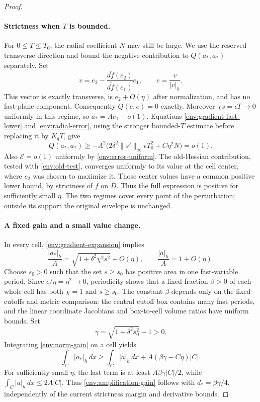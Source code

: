 \begin{proof}
\paragraph{Strictness when $T$ is bounded.}
For $0\le T\le T_0$, the radial coefficient $N$ may still be large.
We use the reserved transverse direction and bound the negative
contribution to $Q(a_*,a_*)$ separately. Set
\begin{equation}\label{env:old-test}
 v=e_2-\frac{d\widetilde f(e_2)}{d\widetilde f(e_1)}e_1,
 \qquad e=\frac{v}{|v|_h}.
\end{equation}
This vector is exactly transverse, is $e_2+O(\eta)$ after
normalization, and has no fast-plane component. Consequently
$Q(e,e)=0$ exactly. Moreover $\chi s=\epsilon T\to0$ uniformly
in this regime, so $a_*=Ae_1+o(1)$. Equations
\eqref{env:gradient-fast-lower} and \eqref{env:radial-error}, using
the stronger bounded-$T$ estimate before replacing it by $K_qT$,
give
\[
 Q(a_*,a_*)\ge
 -A^2\bigl(2\delta^2\|s'\|_\infty\epsilon T_0^2
                  +C\eta^2N\bigr)=o(1).
\]
Also $\mathcal E=o(1)$ uniformly by
\eqref{env:error-uniform}. The old-Hessian contribution, tested with
\eqref{env:old-test}, converges uniformly to its value at the cell
center, where $e_2$ was chosen to maximize it. Those center values
have a common positive lower bound, by strictness of $f$ on
$\overline D$. Thus the full expression is positive for sufficiently
small $\eta$. The two regimes cover every point of the perturbation;
outside its support the original envelope is unchanged.

\paragraph{A fixed gain and a small value change.}
In every cell, \eqref{env:gradient-expansion} implies
\begin{equation}\label{env:norm-gain}
 \frac{|a_*|_h}{A}
   =\sqrt{1+\delta^2\chi^2s^2}+O(\eta),
 \qquad \frac{|a|_h}{A}=1+O(\eta).
\end{equation}
Choose $s_0>0$ such that the set $s\ge s_0$ has positive area in
one fast-variable period. Since $\epsilon/\eta=\eta^2\to0$,
periodicity shows that a fixed fraction $\beta>0$ of each whole
cell has both $\chi=1$ and $s\ge s_0$. The constant $\beta$
depends only on the fixed cutoffs and metric comparison: the central
cutoff box contains many fast periods, and the linear coordinate
Jacobians and box-to-cell volume ratios have uniform bounds. Set
\[
 \gamma=\sqrt{1+\delta^2s_0^2}-1>0.
\]
Integrating \eqref{env:norm-gain} on a cell yields
\[
 \int_C|a_*|_h\,dx
 \ge\int_C|a|_h\,dx+A(\beta\gamma-C\eta)|C|.
\]
For sufficiently small $\eta$, the last term is at least
$A\beta\gamma|C|/2$, while $\int_C|a|_h\,dx\le2A|C|$.
Thus \eqref{env:amplification-gain} follows with
$d_*=\beta\gamma/4$, independently of the current strictness margin
and derivative bounds.


\end{proof}
